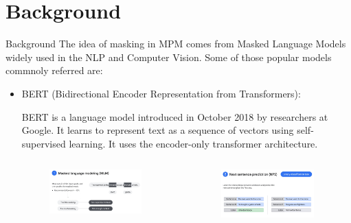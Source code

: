 \documentclass[10pt]{beamer}
\begin{document}
\section{Background}
\begin{frame}{Background}
    The idea of masking in MPM comes from Masked Language Models widely used in
    the NLP and Computer Vision. Some of those popular models commnoly referred are:
    \begin{itemize}
        \item BERT (Bidirectional Encoder Representation from Transformers):

            \small
            BERT is a language
            model introduced in October 2018 by researchers at Google. It learns to
            represent text as a sequence of vectors using self-supervised learning. It uses
            the encoder-only transformer architecture.
            \begin{columns}
                \begin{column}{0.5\textwidth}
                    \begin{figure}
                        \includegraphics[width=0.9\textwidth]{bert1.jpeg}
                    \end{figure}
                \end{column}
                \begin{column}{0.5\textwidth}
                    \begin{figure}
                        \includegraphics[width=0.9\textwidth]{bert2.jpeg}
                    \end{figure}
                \end{column}
            \end{columns}
            \footnotesize


\end{itemize}
\end{frame}
\end{document}
